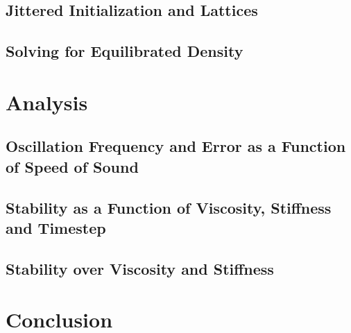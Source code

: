 \documentclass[oneside, a4paper]{book}
\begin{document}
\section{Jittered Initialization and Lattices}
\section{Solving for Equilibrated Density}


\chapter{Analysis}
\section{Oscillation Frequency and Error as a Function of Speed of Sound}
\section{Stability as a Function of Viscosity, Stiffness and Timestep}
\section{Stability over Viscosity and Stiffness}

\chapter{Conclusion}



\printbibliography[
  heading=bibintoc,
  title={Bibliography}
]
\end{document}
